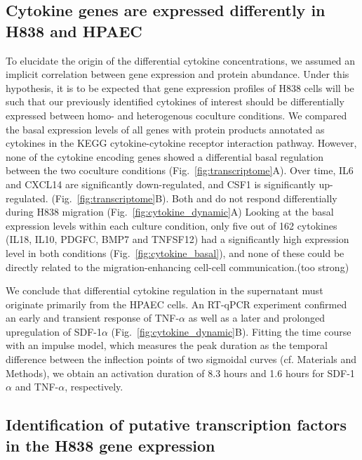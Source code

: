 \subsection*{Cytokine genes are expressed differently in H838 and HPAEC}

To elucidate the origin of the differential cytokine concentrations,
we assumed an implicit correlation between gene expression and protein abundance.
Under this hypothesis, it is to be expected that gene expression profiles of
H838 cells will be such that 
our previously identified cytokines of interest should be differentially 
expressed between homo- and heterogenous coculture conditions.
We compared the basal 
expression levels of all genes with protein products
annotated as cytokines in the KEGG cytokine-cytokine receptor interaction pathway. 
However, none of the cytokine encoding genes 
showed a differential basal regulation between the two coculture conditions 
(Fig.~\ref{fig:transcriptome}A). Over time, IL6 and CXCL14 are significantly
down-regulated, and CSF1 is significantly up-regulated. 
(Fig.~\ref{fig:transcriptome}B).
Both \tnfa and \sdfonea do
not respond differentially during H838 migration (Fig.~\ref{fig:cytokine_dynamic}A)
Looking at the basal expression levels within each culture condition, only five out of 162 cytokines (IL18, IL10, PDGFC, BMP7 and TNFSF12) 
had a significantly high expression level in both conditions
(Fig.~\ref{fig:cytokine_basal}), 
and none of these could be directly related to the migration-enhancing 
cell-cell communication.(too strong)

We conclude that differential cytokine regulation in the supernatant 
must originate primarily from the HPAEC cells.  
An RT-qPCR experiment confirmed an early and transient response of  
TNF-$\alpha$ as well as a later and prolonged upregulation of 
SDF-1$\alpha$ (Fig.~\ref{fig:cytokine_dynamic}B). 
Fitting the time course with an impulse model, which measures the peak 
duration as the 
temporal difference between the inflection points of two
sigmoidal curves (cf. Materials and Methods), 
we obtain an activation duration of  8.3 hours and 1.6 hours for SDF-1$\alpha$
and TNF-$\alpha$, respectively.

\subsection*{Identification of putative transcription factors in the H838 gene expression}

